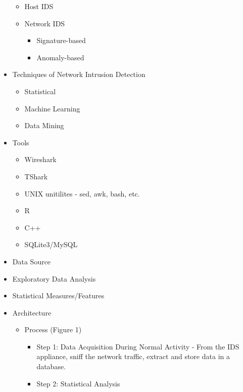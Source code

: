 \documentclass[]{article}
\begin{document}
\begin{itemize}
  \begin{itemize}
  \itemsep1pt\parskip0pt
  \item
    Host IDS
  \item
    Network IDS

    \begin{itemize}
    \itemsep1pt\parskip0pt
    \item
      Signature-based
    \item
      Anomaly-based
    \end{itemize}
  \end{itemize}
\item
  Techniques of Network Intrusion Detection

  \begin{itemize}
  \itemsep1pt\parskip0pt
  \item
    Statistical
  \item
    Machine Learning
  \item
    Data Mining
  \end{itemize}
\item
  Tools

  \begin{itemize}
  \itemsep1pt\parskip0pt
  \item
    Wireshark
  \item
    TShark
  \item
    UNIX unitilites - sed, awk, bash, etc.
  \item
    R
  \item
    C++
  \item
    SQLite3/MySQL
  \end{itemize}
\item
  Data Source
\item
  Exploratory Data Analysis
\item
  Statistical Measures/Features
\item
  Architecture

  \begin{itemize}
  \itemsep1pt\parskip0pt
  \item
    Process (Figure 1)

    \begin{itemize}
    \itemsep1pt\parskip0pt
    \item
      Step 1: Data Acquisition During Normal Activity - From the IDS
      appliance, sniff the network traffic, extract and store data in a
      database.
    \item
      Step 2: Statistical Analysis


\end{itemize}
\end{itemize}
\end{itemize}
\end{document}
